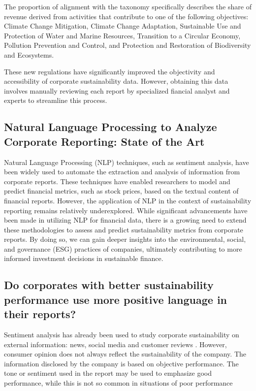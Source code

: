 \documentclass[times]{oupau}
\begin{document}
The proportion of alignment with the taxonomy specifically describes the share of revenue derived from activities that contribute to one of the following objectives: Climate Change Mitigation, Climate Change Adaptation, Sustainable Use and Protection of Water and Marine Resources, Transition to a Circular Economy, Pollution Prevention and Control, and Protection and Restoration of Biodiversity and Ecosystems\cite{european_commission_2021}.
\par
\justify

These new regulations have significantly improved the objectivity and accessibility of corporate sustainability data. However, obtaining this data involves manually reviewing each report by specialized fiancial analyst  and experts to streamline this process.
\par
\justify


\subsection{Natural Language Processing to Analyze Corporate Reporting: State of the Art}
\label{subsec:nlp}

Natural Language Processing (NLP) techniques, such as sentiment analysis, have been widely used to automate the extraction and analysis of information from corporate reports. These techniques have enabled researchers to model and predict financial metrics, such as stock prices, based on the textual content of financial reports\cite{li2010textual, kogan2009predicting}. However, the application of NLP in the context of sustainability reporting remains relatively underexplored. While significant advancements have been made in utilizing NLP for financial data, there is a growing need to extend these methodologies to assess and predict sustainability metrics from corporate reports. By doing so, we can gain deeper insights into the environmental, social, and governance (ESG) practices of companies, ultimately contributing to more informed investment decisions in sustainable finance.
\par
\justify

\subsection{Do corporates with better sustainability performance use more positive language in their reports?}

Sentiment analysis has already been used to study corporate sustainability on external information: news, social media and customer reviews \cite{Zao2023}. However, consumer opinion does not always reflect the sustainability of the company. The information disclosed by the company is based on objective performance. The tone or sentiment used in the report may be used to emphasize good performance, while this is not so common in situations of poor performance \cite{Mucko2021}
\par
\justify
\end{document}

